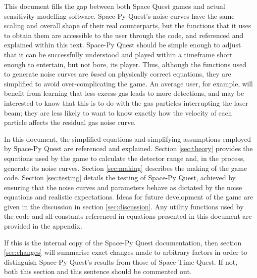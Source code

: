 \documentclass{article}
\begin{document}
\par
This document fills the gap between both Space Quest games and actual sensitivity modelling software. Space-Py Quest's noise curves have the same scaling and overall shape of their real counterparts, but the functions that it uses to obtain them are accessible to the user through the code, and referenced and explained within this text. Space-Py Quest should be simple enough to adjust that it can be successfully understood and played within a timeframe short enough to entertain, but not bore, its player. Thus, although the functions used to generate noise curves are \textit{based} on physically correct equations, they are simplified to avoid over-complicating the game. An average user, for example, will benefit from learning that less excess gas leads to more detections, and may be interested to know that this is to do with the gas particles interrupting the laser beam; they are less likely to want to know exactly how the velocity of each particle affects the 
residual gas noise curve.
\par
In this document, the simplified equations and simplifying assumptions employed by Space-Py Quest are referenced and explained. 
Section \ref{sec:theory} provides the equations used by the game to calculate the detector range and, in the process, generate its noise curves. Section \ref{sec:making} describes the making of the game code. Section \ref{sec:testing} details the testing of Space-Py Quest, achieved by ensuring that the noise curves and parameters behave as dictated by the noise equations and realistic expectations. Ideas for future development of the game are given in the discussion in section \ref{sec:discussion}. Any utility functions used by the code and all constants referenced in equations presented in this document are provided in the appendix. 
\par
If this is the internal copy of the Space-Py Quest documentation, then section \ref{sec:changes} will summarise exact changes made to arbitrary factors in order to distinguish Space-Py Quest's results from those of Space-Time Quest. If not, both this section and this sentence should be commented out. 
\end{document}

